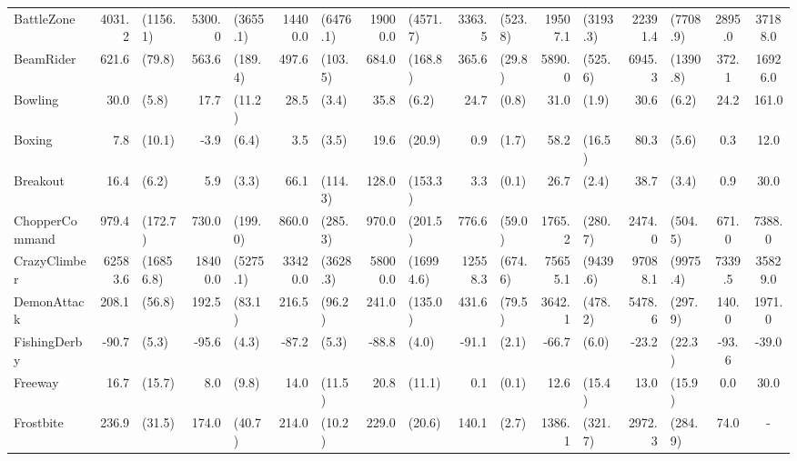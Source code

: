 \begin{landscape}
\begin{changemargin}{0cm}{0cm}
\begin{center}
\begin{table}[!htbp]
\begin{tabular}{l|rlrlrlrlrlrlrlcc}
BattleZone     &   4031.2 &   (1156.1) &   5300.0 &  (3655.1) &    14400.0 &     (6476.1) &  19000.0 &   (4571.7) &   3363.5 &  (523.8) &  19507.1 &   (3193.3) &   22391.4 &   (7708.9) &   2895.0 &  37188.0 \\
BeamRider      &    621.6 &     (79.8) &    563.6 &   (189.4) &      497.6 &      (103.5) &    684.0 &    (168.8) &    365.6 &   (29.8) &   5890.0 &    (525.6) &    6945.3 &   (1390.8) &    372.1 &  16926.0 \\
Bowling        &     30.0 &      (5.8) &     17.7 &    (11.2) &       28.5 &        (3.4) &     35.8 &      (6.2) &     24.7 &    (0.8) &     31.0 &      (1.9) &      30.6 &      (6.2) &     24.2 &    161.0 \\
Boxing         &      7.8 &     (10.1) &     -3.9 &     (6.4) &        3.5 &        (3.5) &     19.6 &     (20.9) &      0.9 &    (1.7) &     58.2 &     (16.5) &      80.3 &      (5.6) &      0.3 &     12.0 \\
Breakout       &     16.4 &      (6.2) &      5.9 &     (3.3) &       66.1 &      (114.3) &    128.0 &    (153.3) &      3.3 &    (0.1) &     26.7 &      (2.4) &      38.7 &      (3.4) &      0.9 &     30.0 \\
ChopperCommand &    979.4 &    (172.7) &    730.0 &   (199.0) &      860.0 &      (285.3) &    970.0 &    (201.5) &    776.6 &   (59.0) &   1765.2 &    (280.7) &    2474.0 &    (504.5) &    671.0 &   7388.0 \\
CrazyClimber   &  62583.6 &  (16856.8) &  18400.0 &  (5275.1) &    33420.0 &     (3628.3) &  58000.0 &  (16994.6) &  12558.3 &  (674.6) &  75655.1 &   (9439.6) &   97088.1 &   (9975.4) &   7339.5 &  35829.0 \\
DemonAttack    &    208.1 &     (56.8) &    192.5 &    (83.1) &      216.5 &       (96.2) &    241.0 &    (135.0) &    431.6 &   (79.5) &   3642.1 &    (478.2) &    5478.6 &    (297.9) &    140.0 &   1971.0 \\
FishingDerby   &    -90.7 &      (5.3) &    -95.6 &     (4.3) &      -87.2 &        (5.3) &    -88.8 &      (4.0) &    -91.1 &    (2.1) &    -66.7 &      (6.0) &     -23.2 &     (22.3) &    -93.6 &    -39.0 \\
Freeway        &     16.7 &     (15.7) &      8.0 &     (9.8) &       14.0 &       (11.5) &     20.8 &     (11.1) &      0.1 &    (0.1) &     12.6 &     (15.4) &      13.0 &     (15.9) &      0.0 &     30.0 \\
Frostbite      &    236.9 &     (31.5) &    174.0 &    (40.7) &      214.0 &       (10.2) &    229.0 &     (20.6) &    140.1 &    (2.7) &   1386.1 &    (321.7) &    2972.3 &    (284.9) &     74.0 &      - \\

\end{tabular}
\end{table}
\end{center}
\end{changemargin}
\end{landscape}
